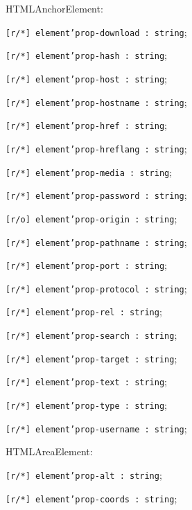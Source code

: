 \begin{icItems}
	\item HTMLAnchorElement:
	\begin{icItems}
		\item \texttt{[r/*] element'prop-download : string};
		\item \texttt{[r/*] element'prop-hash : string};
		\item \texttt{[r/*] element'prop-host : string};
		\item \texttt{[r/*] element'prop-hostname : string};
		\item \texttt{[r/*] element'prop-href : string};
		\item \texttt{[r/*] element'prop-hreflang : string};
		\item \texttt{[r/*] element'prop-media : string};
		\item \texttt{[r/*] element'prop-password : string};
		\item \texttt{[r/o] element'prop-origin : string};
		\item \texttt{[r/*] element'prop-pathname : string};
		\item \texttt{[r/*] element'prop-port : string};
		\item \texttt{[r/*] element'prop-protocol : string};
		\item \texttt{[r/*] element'prop-rel : string};
		\item \texttt{[r/*] element'prop-search : string};
		\item \texttt{[r/*] element'prop-target : string};
		\item \texttt{[r/*] element'prop-text : string};
		\item \texttt{[r/*] element'prop-type : string};
		\item \texttt{[r/*] element'prop-username : string};
	\end{icItems}
	
	\item HTMLAreaElement:
	\begin{icItems}
		\item \texttt{[r/*] element'prop-alt : string};
		\item \texttt{[r/*] element'prop-coords : string};
	\end{icItems}
	

\end{icItems}
